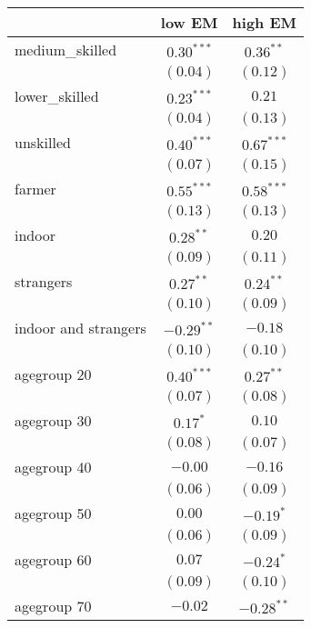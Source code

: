 
\begin{table}
\begin{center}
\begin{tabular}{l c c}
\hline
 & low EM & high EM \\
\hline
medium\_skilled      & $0.30^{***}$  & $0.36^{**}$   \\
                     & $(0.04)$      & $(0.12)$      \\
lower\_skilled       & $0.23^{***}$  & $0.21$        \\
                     & $(0.04)$      & $(0.13)$      \\
unskilled            & $0.40^{***}$  & $0.67^{***}$  \\
                     & $(0.07)$      & $(0.15)$      \\
farmer               & $0.55^{***}$  & $0.58^{***}$  \\
                     & $(0.13)$      & $(0.13)$      \\
indoor               & $0.28^{**}$   & $0.20$        \\
                     & $(0.09)$      & $(0.11)$      \\
strangers            & $0.27^{**}$   & $0.24^{**}$   \\
                     & $(0.10)$      & $(0.09)$      \\
indoor and strangers & $-0.29^{**}$  & $-0.18$       \\
                     & $(0.10)$      & $(0.10)$      \\
agegroup 20          & $0.40^{***}$  & $0.27^{**}$   \\
                     & $(0.07)$      & $(0.08)$      \\
agegroup 30          & $0.17^{*}$    & $0.10$        \\
                     & $(0.08)$      & $(0.07)$      \\
agegroup 40          & $-0.00$       & $-0.16$       \\
                     & $(0.06)$      & $(0.09)$      \\
agegroup 50          & $0.00$        & $-0.19^{*}$   \\
                     & $(0.06)$      & $(0.09)$      \\
agegroup 60          & $0.07$        & $-0.24^{*}$   \\
                     & $(0.09)$      & $(0.10)$      \\
agegroup 70          & $-0.02$       & $-0.28^{**}$  \\

\end{tabular}
\end{center}
\end{table}
